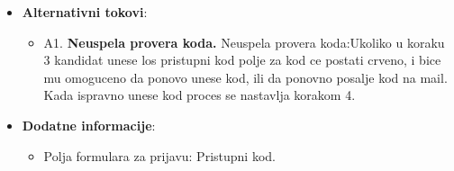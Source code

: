 \begin{itemize}
  \item \textbf{Alternativni tokovi}:
      \begin{itemize}
        \item A1. \textbf{Neuspela provera koda.}
        Neuspela provera koda:Ukoliko u koraku 3 kandidat unese los pristupni kod polje za kod ce postati crveno, i bice mu omoguceno da ponovo unese kod, ili da ponovno posalje kod na mail. Kada ispravno unese kod proces se nastavlja korakom 4.
      \end{itemize}
      
  \item \textbf{Dodatne informacije}:
      \begin{itemize}
        \item Polja formulara za prijavu: Pristupni kod. 
      \end{itemize}
\end{itemize}